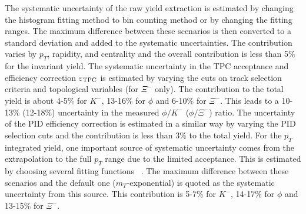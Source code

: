 \documentclass[%
 reprint,	
showpacs,
 amsmath,amssymb,
 aps,
 superscriptaddress,
]{revtex4-1}
\begin{document}
The systematic uncertainty of the raw yield extraction is estimated by changing the histogram fitting method to bin counting method or by changing the fitting ranges. The maximum difference between these scenarios is then converted to a standard deviation and added to the systematic uncertainties. The contribution varies by $p_T$, rapidity, and centrality %
and the overall contribution is less than 5\% for the invariant yield. The systematic uncertainty in the TPC acceptance and efficiency correction $\varepsilon_{\rm TPC}$ is estimated %
by varying the cuts on track selection criteria and topological variables (for $\Xi^-$ only). %
The contribution to the total yield is about 4-5\% for $K^-$, 13-16\% for $\phi$ and 6-10\% for $\Xi^-$. This leads to a 10-13\% (12-18\%) uncertainty in the measured $\phi/K^-$ ($\phi/\Xi^-$) ratio. 
The uncertainty of the PID efficiency correction is estimated in a similar way by varying the PID selection cuts and the contribution is less than 3\% to the total yield.
For the $p_T$ integrated yield, one important source of systematic uncertainty comes from the extrapolation to the full $p_T$ range due to the limited acceptance. This is estimated by choosing several fitting functions %
~\cite{STAR_particleYield}. The maximum difference between these scenarios and the default one ($m_T$-exponential) is quoted as the systematic uncertainty from this source. This contribution is 5-7\% for $K^-$, 14-17\% for $\phi$ and 13-15\% for $\Xi^-$. 
\end{document}
